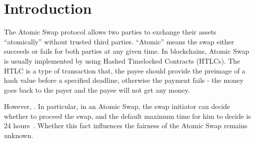 \section{Introduction}
\label{sec:intro}

The Atomic Swap protocol allows two parties to exchange their assets ``atomically'' without trusted third parties.
``Atomic'' means the swap either succeeds or fails for both parties at any given time.
In blockchains, Atomic Swap is usually implemented by using Hashed Timelocked Contracts (HTLCs).
The HTLC is a type of transaction that, the payee should provide the preimage of a hash value before a specified deadline, otherwise the payment fails - the money goes back to the payer and the payee will not get any money.




However, .
In particular, in an Atomic Swap, the swap initiator can decide whether to proceed the swap, and the default maximum time for him to decide is 24 hours~\cite{nolan2013alt}.
Whether this fact influences the fairness of the Atomic Swap remains unknown.

